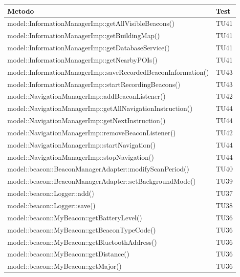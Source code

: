 \documentclass[../DefinizioneDiProdotto.tex]{subfiles}
\begin{document}
\begin{longtabu}to \textwidth{X[5] X[0.8]}
	\toprule
	\textbf{Metodo} & \textbf{Test}\\
	\midrule
	\endhead
	model::\-InformationManagerImp::\-getAllVisibleBeacons() & TU41 \\ 
	\midrule 
	model::\-InformationManagerImp::\-getBuildingMap() & TU41 \\ 
	\midrule 
	model::\-InformationManagerImp::\-getDatabaseService() & TU41 \\ 
	\midrule 
	model::\-InformationManagerImp::\-getNearbyPOIs() & TU41 \\ 
	\midrule 
	model::\-InformationManagerImp::\-saveRecordedBeaconInformation() & TU43 \\ 
	\midrule 
	model::\-InformationManagerImp::\-startRecordingBeacons() & TU43 \\ 
	\midrule 
	model::\-NavigationManagerImp::\-addBeaconListener() & TU42 \\ 
	\midrule 
	model::\-NavigationManagerImp::\-getAllNavigationInstruction() & TU44 \\ 
	\midrule 
	model::\-NavigationManagerImp::\-getNextInstruction() & TU44 \\ 
	\midrule 
	model::\-NavigationManagerImp::\-removeBeaconListener() & TU42 \\ 
	\midrule 
	model::\-NavigationManagerImp::\-startNavigation() & TU44 \\ 
	\midrule 
	model::\-NavigationManagerImp::\-stopNavigation() & TU44 \\ 
	\midrule 
	model::\-beacon::\-BeaconManagerAdapter::\-modifyScanPeriod() & TU40 \\ 
	\midrule 
	model::\-beacon::\-BeaconManagerAdapter::\-setBackgroundMode() & TU39 \\ 
	\midrule 
	model::\-beacon::\-Logger::\-add() & TU37 \\ 
	\midrule 
	model::\-beacon::\-Logger::\-save() & TU38 \\ 
	\midrule 
	model::\-beacon::\-MyBeacon::\-getBatteryLevel() & TU36 \\ 
	\midrule 
	model::\-beacon::\-MyBeacon::\-getBeaconTypeCode() & TU36 \\ 
	\midrule 
	model::\-beacon::\-MyBeacon::\-getBluetoothAddress() & TU36 \\ 
	\midrule 
	model::\-beacon::\-MyBeacon::\-getDistance() & TU36 \\ 
	\midrule 
	model::\-beacon::\-MyBeacon::\-getMajor() & TU36 \\ 

\end{longtabu}
\end{document}
